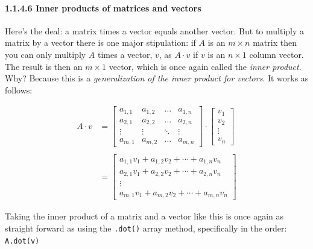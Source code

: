 \documentclass[11pt]{article}
\begin{document}
    \hypertarget{inner-products-of-matrices-and-vectors}{%
\paragraph{1.1.4.6 Inner products of matrices and
vectors}\label{inner-products-of-matrices-and-vectors}}

Here's the deal: a matrix times a vector equals another vector. But to
multiply a matrix by a vector there is one major stipulation: if \(A\)
is an \(m \times n\) matrix then you can only multiply \(A\) times a
vector, \(v\), as \(A\cdot v\) if \(v\) is an \(n \times 1\) column
vector. The result is then an \(m \times 1\) vector, which is once again
called the \emph{inner product}. Why? Because this is a
\emph{generalization of the inner product for vectors}. It works as
follows:

\[ \begin{align} A\cdot v & = \begin{bmatrix} a_{1,1} & a_{1,2} & \dots & a_{1,n} \\ a_{2,1} & a_{2,2} & \dots & a_{2,n} \\ \vdots & \vdots & \ddots & \vdots \\ a_{m,1} & a_{m,2} & \dots & a_{m,n} \end{bmatrix} \cdot \begin{bmatrix} v_{1} \\ v_{2} \\ \vdots \\ v_{n} \end{bmatrix}\\\\ & = \begin{bmatrix} a_{1,1}v_{1} + a_{1,2}v_{2} + \cdots + a_{1,n}v_{n} \\ a_{2,1}v_{1} + a_{2,2}v_{2} + \cdots + a_{2,n}v_{n} \\ \vdots \\ a_{m,1}v_{1} + a_{m,2}v_{2} + \cdots + a_{m,n}v_{n} \end{bmatrix} \end{align} \]

Taking the inner product of a matrix and a vector like this is once
again as straight forward as using the \texttt{.dot()} array method,
specifically in the order: \texttt{A.dot(v)}
\end{document}
